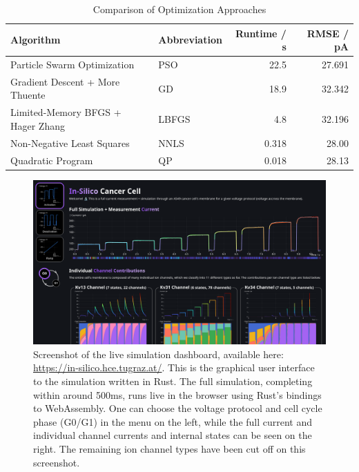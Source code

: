\begin{table}[ht]
  \centering
  \caption{Comparison of Optimization Approaches}
  \begin{tabular}{llrr}
    \textbf{Algorithm}                          & \textbf{Abbreviation} & \textbf{Runtime} / s & \textbf{RMSE} / pA \\
    \midrule
    Particle Swarm Optimization                 & PSO                   & 22.5                 & 27.691             \\
    Gradient Descent + More Thuente             & GD                    & 18.9                 & 32.342             \\
    Limited-Memory BFGS + Hager Zhang           & LBFGS                 & 4.8                  & 32.196             \\
    Non-Negative Least Squares \cite{1997-nnls} & NNLS                  & 0.318                & 28.00              \\
    Quadratic Program                           & QP                    & 0.018                & 28.13              \\
  \end{tabular}
  \label{table:optimization-comparison}
\end{table}

\begin{figure}[ht]
  \includegraphics[width=\textwidth]{../figures/above-the-fold-screenshot.png}
  \caption{Screenshot of the live simulation dashboard, available here: \url{https://in-silico.hce.tugraz.at/}. This is the graphical user interface to the simulation written in Rust. The full simulation, completing within around 500ms, runs live in the browser using Rust's bindings to WebAssembly. One can choose the voltage protocol and cell cycle phase (G0/G1) in the menu on the left, while the full current and individual channel currents and internal states can be seen on the right. The remaining ion channel types have been cut off on this screenshot.}
  \label{figure:screenshot}
\end{figure}

